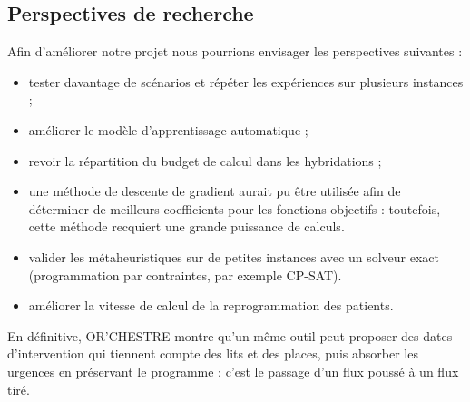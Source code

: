 \documentclass[11pt,a4paper]{article}
\begin{document}
\subsection{Perspectives de recherche}

Afin d'améliorer notre projet nous pourrions envisager les perspectives suivantes :
\begin{itemize}
    \item tester davantage de scénarios et répéter les expériences sur plusieurs instances ;
    \item améliorer le modèle d'apprentissage automatique ;
    \item revoir la répartition du budget de calcul dans les hybridations ;
    \item une méthode de descente de gradient aurait pu être utilisée afin de déterminer de meilleurs coefficients pour les fonctions objectifs : toutefois, cette méthode recquiert une grande puissance de calculs.
    \item valider les métaheuristiques sur de petites instances avec un solveur exact (programmation par contraintes, par exemple CP-SAT).
    \item améliorer la vitesse de calcul de la reprogrammation des patients.
\end{itemize}

En définitive, OR'CHESTRE montre qu'un même outil peut proposer des dates d'intervention qui tiennent compte des lits et des places, puis absorber les urgences en préservant le programme : c'est le passage d'un flux poussé à un flux tiré.
\end{document}
